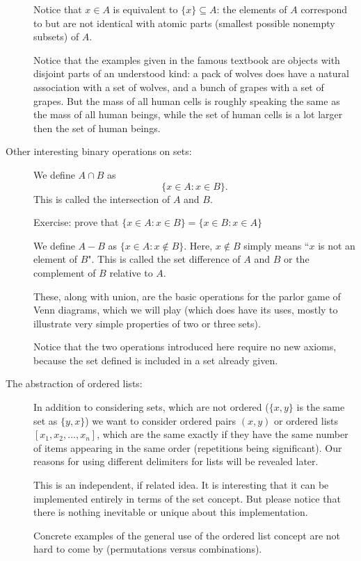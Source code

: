 \documentclass[12pt]{article}
\begin{document}
\begin{description}
Notice that $x \in A$ is equivalent to $\{x\} \subseteq A$:  the elements of $A$ correspond to but are not identical with atomic parts (smallest possible nonempty subsets) of $A$.

Notice that the examples given in the famous textbook are objects with disjoint parts of an understood kind:  a pack of wolves does have a natural association with a set of wolves, and a bunch of grapes with a set of grapes.   But the mass of all human cells is roughly speaking the same as the mass of all human beings, while the set of human cells is a lot larger then the set of human beings.




\item[Other interesting binary operations on sets:]

We define $A \cap B$ as $$\{x \in A:x \in B\}.$$  This is called the intersection of $A$ and $B$.

Exercise:  prove that $\{x \in A:x \in B\} = \{x \in B:x \in A\}$

We define $A - B$ as $\{x \in A:x \not\in B\}$.  Here, $x \not\in B$ simply means ``$x$ is not an element of $B$".
This is called the set difference of $A$ and $B$ or the complement of $B$ relative to $A$.

These, along with union, are the basic operations for the parlor game of Venn diagrams, which we will play (which does have its uses, mostly to illustrate very simple properties of two or three sets).

Notice that the two operations introduced here require no new axioms, because the set defined is included in a set already given.

\item[The abstraction of ordered lists:]

In addition to considering sets, which are not ordered ($\{x,y\}$ is the same set as $\{y,x\}$) we want to consider
ordered pairs $(x,y)$ or ordered lists $[x_1,x_2,\ldots,x_n]$, which are the same exactly if they have the same number of items appearing in the same order (repetitions being significant).  Our reasons for using different delimiters for lists will be revealed later.

This is an independent, if related idea.  It is interesting that it can be implemented entirely in terms of the set concept.  But please notice that there is nothing inevitable or unique about this implementation.

Concrete examples of the general use of the ordered list concept are not hard to come by (permutations versus combinations).


\end{description}
\end{document}
